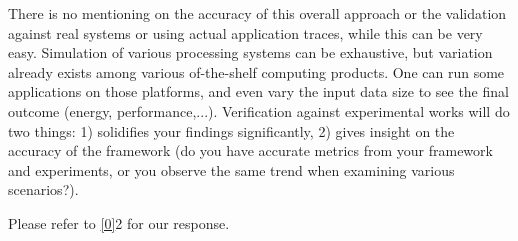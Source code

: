 \begin{reviewer}
There is no mentioning on the accuracy of this overall approach or the
validation against real systems or using actual application traces, while this
can be very easy. Simulation of various processing systems can be exhaustive,
but variation already exists among various of-the-shelf computing products. One
can run some applications on those platforms, and even vary the input data size
to see the final outcome (energy, performance,...). Verification against
experimental works will do two things: 1) solidifies your findings
significantly, 2) gives insight on the accuracy of the framework (do you have
accurate metrics from your framework and experiments, or you observe the same
trend when examining various scenarios?).
\end{reviewer}

\begin{authors}
Please refer to \cref{0}{2} for our response.

\begin{actions}
\end{actions}
\end{authors}
